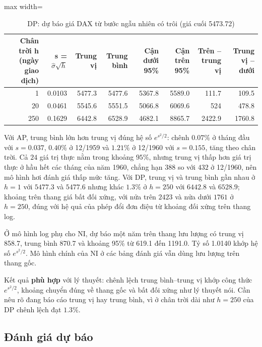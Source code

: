 \begin{table}[H]
\centering\footnotesize
\caption{DP: dự báo giá DAX từ bước ngẫu nhiên có trôi (giá cuối 5473.72)}\label{tab:tab_b12_09_dp_forecast}
\begin{adjustbox}{max width=\linewidth}
\begin{tabular}{|r|r|r|r|r|r|r|r|}
\toprule
Chân trời h (ngày giao dịch) & s = $\hat{\sigma}\sqrt{h}$ & Trung vị & Trung bình & Cận dưới 95\% & Cận trên 95\% & Trên – trung vị & Trung vị – dưới \\
\midrule
1 & 0.0103 & 5477.3 & 5477.6 & 5367.8 & 5589.0 & 111.7 & 109.5 \\
20 & 0.0461 & 5545.6 & 5551.5 & 5066.8 & 6069.6 & 524 & 478.8 \\
250 & 0.1629 & 6442.8 & 6528.9 & 4682.1 & 8865.7 & 2422.9 & 1760.8 \\
\bottomrule
\end{tabular}
\end{adjustbox}
\end{table}
 Với AP, trung bình lớn hơn trung vị đúng hệ số $e^{s^2/2}$: chênh $0.07\%$ ở tháng đầu với $s=0.037$, $0.40\%$ ở 12/1959 và $1.21\%$ ở 12/1960 với $s=0.155$, tăng theo chân trời. Cả $24$ giá trị thực nằm trong khoảng $95\%$, nhưng trung vị thấp hơn giá trị thực ở hầu hết các tháng của năm 1960, chẳng hạn $388$ so với $432$ ở 12/1960, nên mô hình hơi đánh giá thấp mức tăng. Với DP, trung vị và trung bình gần nhau ở $h=1$ với $5477.3$ và $5477.6$ nhưng khác $1.3\%$ ở $h=250$ với $6442.8$ và $6528.9$; khoảng trên thang giá bất đối xứng, với nửa trên $2423$ và nửa dưới $1761$ ở $h=250$, đúng với hệ quả của phép đổi đơn điệu từ khoảng đối xứng trên thang log.

Ở mô hình log phụ cho NI, dự báo một năm trên thang lưu lượng có trung vị 858.7, trung bình 870.7 và khoảng 95\% từ 619.1 đến 1191.0. Tỷ số 1.0140 khớp hệ số $e^{s^2/2}$. Mô hình chính của NI ở các bảng đánh giá vẫn dùng lưu lượng trên thang gốc.

 Kết quả \textbf{phù hợp} với lý thuyết: chênh lệch trung bình--trung vị khớp công thức $e^{s^2/2}$, khoảng chuyển đúng về thang gốc và bất đối xứng như lý thuyết nói. Cần nêu rõ đang báo cáo trung vị hay trung bình, vì ở chân trời dài như $h=250$ của DP chênh lệch đạt $1.3\%$.

\subsection{Đánh giá dự báo}

